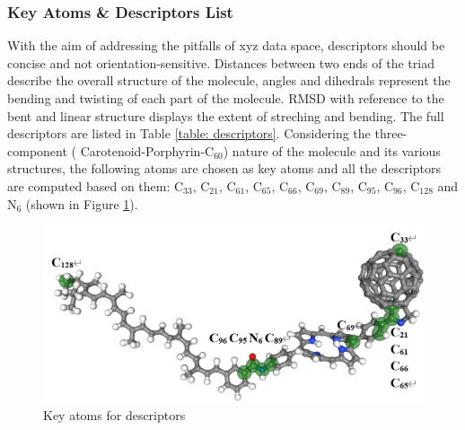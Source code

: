 \documentclass[a4paper]{article}
\begin{document}
\subsubsection{Key Atoms \& Descriptors List}
With the aim of addressing the pitfalls of xyz data space, descriptors should be concise and not orientation-sensitive. Distances between two ends of the triad describe the overall structure of the molecule, angles and dihedrals represent the bending and twisting of each part of the molecule. RMSD with reference to the bent and linear structure displays the extent of streching and bending. The full descriptors are listed in Table \ref{table: descriptors}. Considering the three-component ( Carotenoid-Porphyrin-\(\text{C}_{60}\))  nature of the molecule and its various structures, the following atoms are chosen as key atoms and all the descriptors are computed based on them: \(\text{C}_{33}\), \(\text{C}_{21}\), \(\text{C}_{61}\), \(\text{C}_{65}\), \(\text{C}_{66}\), \(\text{C}_{69}\), \(\text{C}_{89}\), \(\text{C}_{95}\), \(\text{C}_{96}\), \(\text{C}_{128}\) and \(\text{N}_{6}\) (shown in Figure \ref{fig: key atoms}).

\begin{figure}[H]
    \centering
    \includegraphics[width=0.75\linewidth]{projects/Gustave_Li/Docs/pics/key_atoms.png}
    \caption{Key atoms for descriptors}
    \label{fig: key atoms}
\end{figure} 
\end{document}
